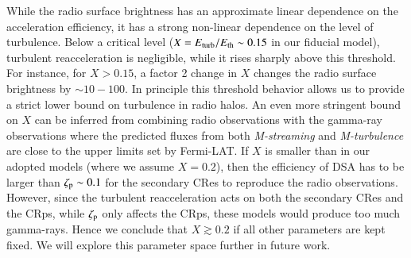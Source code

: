 \documentclass[useAMS,usenatbib]{mn2e}
\newcommand{\Mstream}{{\it M-streaming}\xspace}
\newcommand{\Mflatturb}{{\it M-turbulence}\xspace}
\begin{document}
While the radio surface brightness has an approximate linear
dependence on the acceleration efficiency, it has a strong non-linear
dependence on the level of turbulence. Below a critical level ($X =
E_{\mathrm{turb}}/E_{\mathrm{th}} \sim 0.15$ in our fiducial model), turbulent
reacceleration is negligible, while it rises sharply above this
threshold. For instance, for $X>0.15$, a factor 2 change in $X$
changes the radio surface brightness by $\sim 10-100$. In principle
this threshold behavior allows us to provide a strict lower bound on
turbulence in radio halos. An even more stringent bound on $X$ can be
inferred from combining radio observations with the gamma-ray
observations where the predicted fluxes from both \Mstream and
\Mflatturb are close to the upper limits set by Fermi-LAT. If $X$ is
smaller than in our adopted models (where we assume $X=0.2$), then the
efficiency of DSA has to be larger than $\zeta_{\mathrm{p}}\sim 0.1$ for
the secondary CRes to reproduce the radio observations. However, since
the turbulent reacceleration acts on both the secondary CRes and the
CRps, while $\zeta_{\mathrm{p}}$ only affects the CRps, these models would
produce too much gamma-rays. Hence we conclude that $X\gtrsim0.2$ if
all other parameters are kept fixed. We will explore this parameter
space further in future work.
\end{document}
